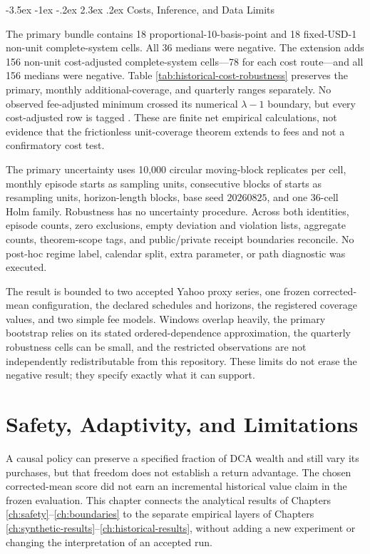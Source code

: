 \documentclass[12pt,a4paper,oneside]{report}
\makeatletter
\renewcommand\section{\@startsection{section}{1}{\z@}%
  {-3.5ex \@plus -1ex \@minus -.2ex}%
  {2.3ex \@plus .2ex}%
  {\normalfont\fontsize{14}{17}\selectfont\bfseries}}
\makeatother
\begin{document}
\section{Costs, Inference, and Data Limits}
\label{sec:cost-robustness}

The primary bundle contains 18 proportional-10-basis-point and 18 fixed-USD-1
non-unit complete-system cells. All 36 medians were negative. The extension
adds 156 non-unit cost-adjusted complete-system cells---78 for each cost
route---and all 156 medians were negative. Table
\ref{tab:historical-cost-robustness} preserves the primary, monthly
additional-coverage, and quarterly ranges separately. No observed fee-adjusted minimum
crossed its numerical $\lambda-1$ boundary, but every cost-adjusted row is
tagged . These are finite net empirical
calculations, not evidence that the frictionless unit-coverage theorem extends
to fees and not a confirmatory cost test.

The primary uncertainty uses 10,000 circular moving-block replicates per cell,
monthly episode starts as sampling units, consecutive blocks of starts as
resampling units, horizon-length blocks, base seed $20260825$, and one 36-cell
Holm family. Robustness has no uncertainty procedure. Across both identities,
episode counts, zero exclusions, empty deviation and violation lists, aggregate
counts, theorem-scope tags, and public/private receipt boundaries reconcile.
No post-hoc regime label, calendar split, extra parameter, or path diagnostic
was executed.

The result is bounded to two accepted Yahoo proxy series, one frozen
corrected-mean configuration, the declared schedules and horizons, the registered
coverage values, and two simple fee models. Windows overlap heavily, the
primary bootstrap relies on its stated ordered-dependence approximation, the
quarterly robustness cells can be small, and the restricted observations are
not independently redistributable from this repository. These limits do not
erase the negative result; they specify exactly what it can support.

\chapter{Safety, Adaptivity, and Limitations}
\label{ch:discussion}

A causal policy can preserve a specified fraction of DCA wealth and still
vary its purchases, but that freedom does not establish a return advantage. The chosen corrected-mean score did not earn an
incremental historical value claim in the frozen evaluation. This chapter
connects the analytical results of Chapters \ref{ch:safety}--\ref{ch:boundaries}
to the separate empirical layers of Chapters
\ref{ch:synthetic-results}--\ref{ch:historical-results}, without adding a new
experiment or changing the interpretation of an accepted run.
\end{document}
